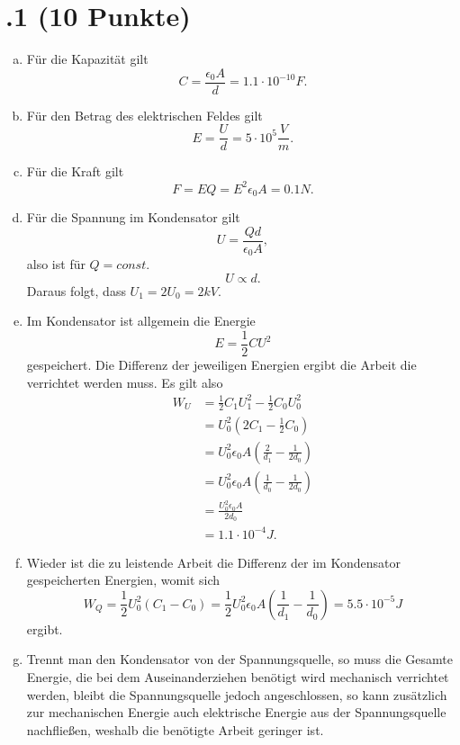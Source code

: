 \section*{\nr.1 \titone (10 Punkte)}
\begin{enumerate}[(a)]
\item Für die Kapazität gilt
\begin{equation}
  C=\frac{\epsilon_0A}{d}=1.1\cdot 10^{-10}F.
\end{equation}
\item Für den Betrag des elektrischen Feldes gilt
\begin{equation}
  E=\frac{U}{d}=5\cdot 10^5 \frac{V}{m}.
\end{equation}
\item Für die Kraft gilt
\begin{equation}
  F=EQ=E^2\epsilon_0A=0.1N.
\end{equation}
\item Für die Spannung im Kondensator gilt
\begin{equation}
  U=\frac{Qd}{\epsilon_0A},
\end{equation}
also ist für $Q=const.$
\begin{equation}
  U\propto d.
\end{equation}
Daraus folgt, dass $U_1=2U_0=2kV$.
\item Im Kondensator ist allgemein die Energie 
\begin{equation}
  E=\frac{1}{2}CU^2
\end{equation}
gespeichert. 
Die Differenz der jeweiligen Energien ergibt die Arbeit die verrichtet werden muss. Es gilt also
\begin{align}
  W_U&=\frac{1}{2}C_1U_1^2- \frac{1}{2}C_0U_0^2 \\
  &= U_0^2 \left(2C_1-\frac{1}{2}C_0\right)\\
  &= U_0^2 \epsilon_0A\left(\frac{2}{d_1}-\frac{1}{2d_0}\right)\\
  &= U_0^2 \epsilon_0A\left(\frac{1}{d_0}-\frac{1}{2d_0}\right)\\
  &= \frac{U_0^2 \epsilon_0A}{2d_0}\\
  &=1.1\cdot10^{-4}J.
\end{align}
\item Wieder ist die zu leistende Arbeit die Differenz der im Kondensator gespeicherten Energien, womit sich 
\begin{equation}
  W_Q=\frac{1}{2}U_0^2(C_1-C_0)=\frac{1}{2}U_0^2\epsilon_0A\left(\frac{1}{d_1}-\frac{1}{d_0}\right)=5.5 \cdot 10^{-5}J
\end{equation}
ergibt.
\item Trennt man den Kondensator von der Spannungsquelle, so muss die Gesamte Energie, die bei dem Auseinanderziehen benötigt wird mechanisch verrichtet werden, bleibt die Spannungsquelle jedoch angeschlossen, so kann zusätzlich zur mechanischen Energie auch elektrische Energie aus der Spannungsquelle nachfließen, weshalb die benötigte Arbeit geringer ist.
\end{enumerate}
